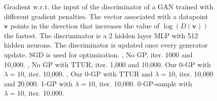 \documentclass{article} %
\begin{document}
\begin{figure}

\caption{Gradient w.r.t. the input of the discriminator of a GAN trained with different gradient penalties. The vector associated with a datapoint $\bm v$ points in the direction that increases the value of $\log\left(D(\bm v)\right)$ the fastest. The discriminator is a 2 hidden layer MLP with 512 hidden neurons. The discriminator is updated once every generator update. SGD is used for optimization.
\protect{}, \protect{} No GP, iter. 1000 and 10,000. 
\protect{},
\protect{} No GP with TTUR, iter. 1,000 and 10,000.
\protect{} Our 0-GP with $\lambda = 10$, iter. 10,000. 
\protect{}, \protect{} Our 0-GP with TTUR and $\lambda = 10$, iter. 10,000 and 20,000. 
\protect{} 1-GP with $\lambda = 10$, iter. 10,000. 
\protect{} 0-GP-sample with $\lambda = 10$, iter. 10,000. 
}
\label{fig:gradField}
\end{figure}
\end{document}
